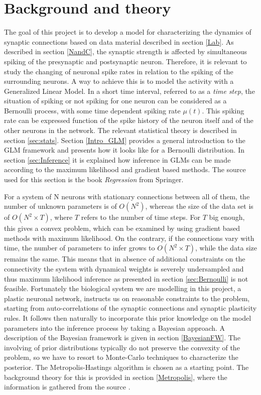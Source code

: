 
\chapter{Background and theory}
\label{ch:theory}

\nocite{Regression}


The goal of this project is to develop a model for characterizing the dynamics of synaptic connections based on data material described in section \ref{Lab}. As described in section \ref{NandC}, the synaptic strength is affected by simultaneous spiking of the presynaptic and postsynaptic neuron. Therefore, it is relevant to study the changing of neuronal spike rates in relation to the spiking of the surrounding neurons. A way to achieve this is to model the activity with a Generalized Linear Model. In a short time interval, referred to as a \textit{time step}, the situation of spiking or not spiking for one neuron can be considered as a Bernoulli process, with some time dependent spiking rate $\mu (t)$. This spiking rate can be expressed function of the spike history of the neuron itself and of the other neurons in the network. The relevant statistical theory is described in section \ref{sec:stats}. Section \ref{Intro_GLM} provides a general introduction to the GLM framework and presents how it looks like for a Bernoulli distribution. In section \ref{sec:Inference} it is explained how inference in GLMs can be made according to the maximum likelihood and gradient based methods. The source used for this section is the book \textit{Regression} from Springer. 

For a system of N neurons with stationary connections between all of them, the number of unknown parameters is of $O(N^2)$, whereas the size of the data set is of $O(N^2 \times T)$, where $T$ refers to the number of time steps. For $T$ big enough, this gives a convex problem, which can be examined by using gradient based methods with maximum likelihood. On the contrary, if the connections vary with time, the number of parameters to infer grows to $O(N^2 \times T)$, while the data size remains the same. This means that in absence of additional constraints on the connectivity the system with dynamical weights is severely undersampled and thus maximum likelihood inference as presented in section \ref{sec:Bernoulli} is not feasible. Fortunately the biological system we are modelling in this project, a plastic neuronal network, instructs us on reasonable constraints to the problem, starting from auto-correlations of the synaptic connections and synaptic plasticity rules. It follows then naturally to incorporate this prior knowledge on the model parameters into the inference process by taking a Bayesian approach. A description of the Bayesian framework is given in section \ref{BayesianFW}. The involving of prior distributions typically do not preserve the convexity of the problem, so we have to resort to Monte-Carlo techniques to characterize the posterior. The Metropolis-Hastings algorithm is chosen as a starting point. The background theory for this is provided in section \ref{Metropolis}, where the information is gathered from the source \cite{MC}.

